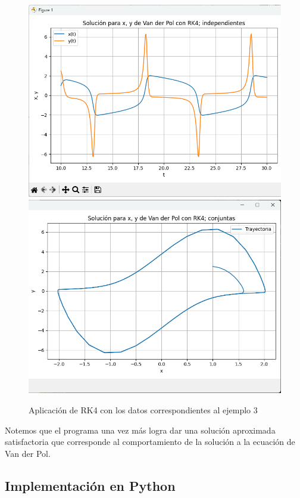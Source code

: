 \documentclass[12pt, a4paper]{article}
\begin{document}
\begin{figure}[H]
	\centering
	\includegraphics[scale=0.5]{../auxiliary/assets/ejemplo3-indiv.png}
	\includegraphics[scale=0.5]{../auxiliary/assets/ejemplo3-conj.png}
	\caption{Aplicación de RK4 con los datos correspondientes al ejemplo 3}
\end{figure}
Notemos que el programa una vez más logra dar una solución aproximada satisfactoria que corresponde al comportamiento de la solución a la ecuación de Van der Pol.

\subsection{Implementación en Python}\label{sect:python}
\end{document}
